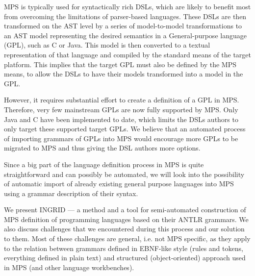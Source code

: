  MPS is typically used for syntactically rich DSLs, which are likely to benefit most from overcoming the limitations of parser-based languages. These DSLs are then transformed on the AST level by a series of model-to-model transformations to an AST model representing the desired semantics in a General-purpose language (GPL), such as C or Java. This model is then converted to a textual representation of that language and compiled by the standard means of the target platform. This implies that the target GPL must also be defined by the MPS means, to allow the DSLs to have their models transformed into a model in the GPL.

 However, it requires substantial effort to create a definition of a GPL in MPS. Therefore, very few mainstream GPLs are now fully supported by MPS. Only Java and C have been implemented to date, which limits the DSLs authors to only target these supported target GPLs. We believe that an automated process of importing grammars of GPLs into MPS would encourage more GPLs to be migrated to MPS and thus giving the DSL authors more options.


 Since a big part of the language definition process in MPS is quite straightforward and can possibly be automated, we will look into the possibility of automatic import of already existing general purpose languages into MPS using a grammar description of their syntax.

We present INGRID --- a method and a tool for semi-automated construction of MPS definition of programming languages based on their ANTLR grammars.
We also discuss challenges that we encountered during this process and our solution to them. Most of these challenges are general, i.e. not MPS specific, as they apply to the relation between grammars defined in EBNF-like style (rules and tokens, everything defined in plain text) and structured (object-oriented) approach used in MPS (and other language workbenches).

